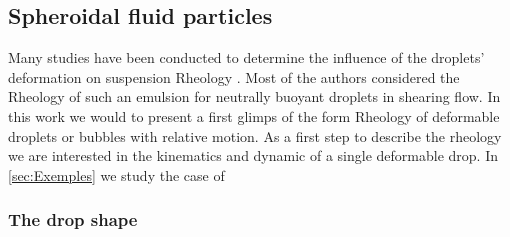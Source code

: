 
\subsection{Spheroidal fluid particles}

Many studies have been conducted to determine the influence of the droplets' deformation on suspension Rheology \citet{goddard1967nonlinear,lhuillier1987phenomenology,maffettone1998equation}.
Most of the authors considered the Rheology of such an emulsion for neutrally buoyant droplets in shearing flow. 
In this work we would to present a first glimps  of the form Rheology of deformable droplets or bubbles with relative motion. 
As a first step to describe the rheology we are interested in the kinematics   and dynamic of a single deformable drop. 
In \ref{sec:Exemples} we study the case of 

\subsubsection*{The drop shape}

